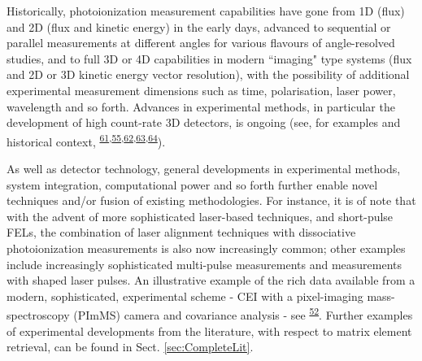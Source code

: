 \documentclass[10pt]{article}
\begin{document}
Historically, photoionization measurement capabilities have gone from 1D (flux) and 2D (flux and kinetic energy) in the early days, advanced to sequential or parallel measurements at different angles for various flavours of angle-resolved studies, and to full 3D or 4D capabilities in modern ``imaging" type systems (flux and 2D or 3D kinetic energy vector resolution), with the possibility of additional experimental measurement dimensions such as time, polarisation, laser power, wavelength and so forth. Advances in experimental methods, in particular the development of high count-rate 3D detectors, is ongoing (see, for examples and historical context, \textsuperscript{\hyperref[csl:61]{61},\hyperref[csl:55]{55},\hyperref[csl:62]{62},\hyperref[csl:63]{63},\hyperref[csl:64]{64}}). 

As well as detector technology, general developments in experimental methods, system integration, computational power and so forth further enable novel techniques and/or fusion of existing methodologies. For instance, it is of note that with the advent of more sophisticated laser-based techniques, and short-pulse FELs, the combination of laser alignment techniques with dissociative photoionization measurements is also now increasingly common; other examples include increasingly sophisticated multi-pulse measurements and measurements with shaped laser pulses. An illustrative example of the rich data available from a modern, sophisticated, experimental scheme - CEI with a pixel-imaging mass-spectroscopy (PImMS) camera and covariance analysis - see \textsuperscript{\hyperref[csl:52]{52}}. Further examples of experimental developments from the literature, with respect to matrix element retrieval, can be found in Sect. \ref{sec:CompleteLit}.


\end{document}
